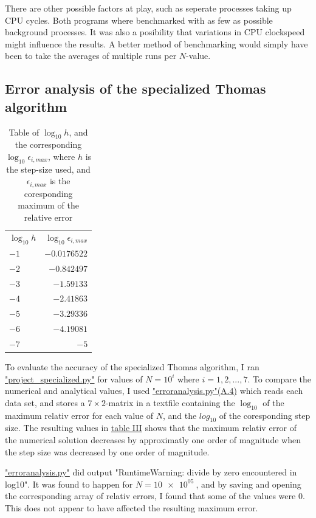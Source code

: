 \documentclass[english,notitlepage,reprint]{revtex4-1}  %
\begin{document}
There are other possible factors at play, such as seperate processes taking up CPU cycles. Both programs where benchmarked with as few as possible background processes. It was also a posibility that variations in CPU clockspeed might influence the results. A better method of benchmarking would simply have been to take the averages of multiple runs per \(N\)-value.
 
\subsection{Error analysis of the specialized Thomas algorithm}\label{subsec:43}
\begin{table}[H]
	\centering
	\label{tab:431}
	\begin{tabular}{l|r}
	\(\log_{10}h\) & \(\log_{10}\epsilon_{i,max}\) \\
	\(-1\) & \(-0.0176522\) \\
	\(-2\) & \(-0.842497\) \\
	\(-3\) & \(-1.59133\) \\
	\(-4\) & \(-2.41863\) \\
	\(-5\) & \(-3.29336\) \\
	\(-6\) & \(-4.19081\) \\
	\(-7\) & \(-5\) \\
	\end{tabular}
	\caption{Table of \(\log_{10}h\), and the corresponding \(\log_{10}\epsilon_{i,max}\),
	where \(h\) is the step-size used, and \(\epsilon_{i,max}\) is the coresponding
	maximum of the relative error}
\end{table}

To evaluate the accuracy of the specialized Thomas algorithm, I ran \hyperref[A:2]{"project\_specialized.py"} for values of \(N=10^{i}\) where \(i=1,2,...,7\). To compare the numerical and analytical values, I used \hyperref[A:4]{"erroranalysis.py"(A.4)} which reads each data set, and stores a \(7\times 2\)-matrix in a textfile containing the \(\log_{10}\) of the maximum relativ error for each value of \(N\), and the \(log_{10}\) of the coresponding step size. The resulting values in \hyperref[tab:431]{table III} shows that the maximum relativ error of the numerical solution decreases by approximatly one order of magnitude when the step size was decreased by one order of magnitude.

\hyperref[A:4]{"erroranalysis.py"} did output "RuntimeWarning: divide by zero encountered in log10". It was found to happen for \(N=\SI{10e+05}{}\), and by saving and opening the corresponding array of relativ errors, I found that some of the values were \(0\). This does not appear to have affected the resulting maximum error.
\end{document}
